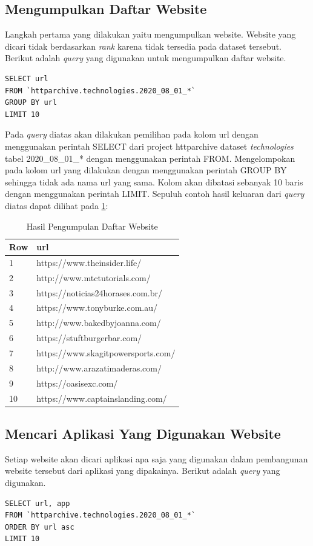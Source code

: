\subsection{Mengumpulkan Daftar Website}
Langkah pertama yang dilakukan yaitu mengumpulkan website. Website yang dicari tidak berdasarkan \textit{rank} karena tidak tersedia pada dataset tersebut. Berikut adalah \textit{query} yang digunakan untuk mengumpulkan daftar website.
\begin{lstlisting}
SELECT url
FROM `httparchive.technologies.2020_08_01_*`
GROUP BY url
LIMIT 10
\end{lstlisting}

Pada \textit{query} diatas akan dilakukan pemilihan pada kolom url dengan menggunakan perintah SELECT dari project httparchive dataset \textit{technologies} tabel 2020\_08\_01\_* dengan menggunakan perintah FROM. Mengelompokan pada kolom url yang dilakukan dengan menggunakan perintah GROUP BY sehingga tidak ada nama url yang sama. Kolom akan dibatasi sebanyak 10 baris dengan menggunakan perintah LIMIT. Sepuluh contoh hasil keluaran dari \textit{query} diatas dapat dilihat pada \ref{table:contoh_langkah1}:

\begin{table}[H]
\centering
\begin{tabular}{|l|l|}
	\hline
	\textbf{Row} & \textbf{url}\\
	\hline
	1 & https://www.theinsider.life/\\
	\hline
	2 & http://www.mtctutorials.com/ \\
	\hline
	3 & https://noticias24horases.com.br/\\
	\hline
	4 & https://www.tonyburke.com.au/ \\
	\hline
	5 & http://www.bakedbyjoanna.com/\\
	\hline
	6 & https://stuftburgerbar.com/\\
	\hline
	7 & https://www.skagitpowersports.com/\\
	\hline
	8 & http://www.arazatimaderas.com/ \\
	\hline
	9 & https://oasisexc.com/\\
	\hline
	10 & https://www.captainslanding.com/\\
	\hline
\end{tabular}
\caption{Hasil Pengumpulan Daftar Website}
\label{table:contoh_langkah1}
\end{table}

\subsection{Mencari Aplikasi Yang Digunakan Website}
Setiap website akan dicari aplikasi apa saja yang digunakan dalam pembangunan website tersebut dari aplikasi yang dipakainya. Berikut adalah \textit{query} yang digunakan.
\begin{lstlisting}
SELECT url, app
FROM `httparchive.technologies.2020_08_01_*`
ORDER BY url asc
LIMIT 10
\end{lstlisting}

